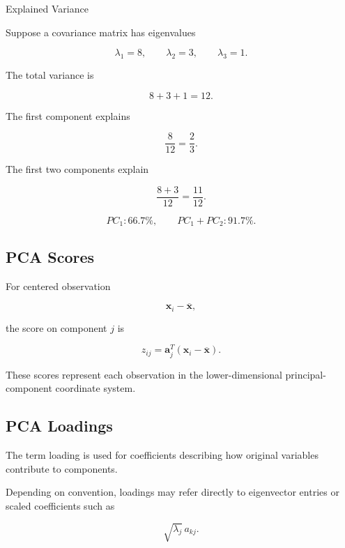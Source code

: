 \begin{workedexamplebox}{Explained Variance}

Suppose a covariance matrix has eigenvalues

\[
\lambda_1=8,
\qquad
\lambda_2=3,
\qquad
\lambda_3=1.
\]

The total variance is

\[
8+3+1=12.
\]

The first component explains

\[
\frac8{12}
=
\frac23.
\]

The first two components explain

\[
\frac{8+3}{12}
=
\frac{11}{12}.
\]

\begin{answerbox}
\[
\boxed{
PC_1:
66.7\%,
\qquad
PC_1+PC_2:
91.7\%.
}
\]
\end{answerbox}

\end{workedexamplebox}

\subsection{PCA Scores}
\label{subsec:pca-scores}

For centered observation

\[
\mathbf{x}_i-\overline{\mathbf{x}},
\]

the score on component \(j\) is

\[
\boxed{
z_{ij}
=
\mathbf{a}_j^T
(
\mathbf{x}_i-\overline{\mathbf{x}}
).
}
\]

These scores represent each observation in the lower-dimensional
principal-component coordinate system.

\subsection{PCA Loadings}
\label{subsec:pca-loadings}

The term loading is used for coefficients describing how original
variables contribute to components.

Depending on convention, loadings may refer directly to eigenvector
entries or scaled coefficients such as

\[
\boxed{
\sqrt{\lambda_j}\,a_{kj}.
}
\]

